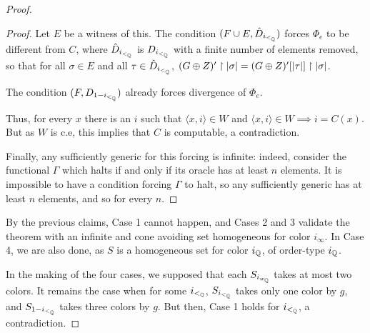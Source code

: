 \begin{proof}
\begin{proof}
     Let $E$ be a witness of
      this. The condition $(F\cup E, \hat D_{i_{<_{\mathbb{Q}}}})$ forces $\Phi_e$ to
      be different from $C$, where $\hat D_{i_{<_{\mathbb{Q}}}}$ is $D_{i_{<_{\mathbb{Q}}}}$ with a
      finite number of elements removed, so that for all $\sigma\in E$ and all $\tau\in \hat D_{i_{<_{\mathbb{Q}}}}$,
      $(G\oplus Z)'\upharpoonright|\sigma| = (G\oplus Z)'[|\tau|]\upharpoonright|\sigma|$.

     The condition $(F,D_{1-{i_{<_{\mathbb{Q}}}}})$ already forces divergence of $\Phi_e$.

     Thus, for every $x$ there is an $i$ such that $\langle x,i\rangle\in W$ and $\langle x,i\rangle\in W\implies i=C(x)$. But as $W$ is c.e, this implies that $C$ is computable, a contradiction.
    


	\medskip
      Finally, any sufficiently generic for this forcing is infinite: indeed, consider the functional $\Gamma$ which halts if and only if its oracle has at least $n$ elements. It is impossible to have a condition forcing $\Gamma$ to halt, so any sufficiently generic has at least $n$ elements, and so for every $n$. %
    \end{proof}
    By the previous claims, Case 1 cannot happen, and Cases 2 and 3 validate the theorem with an infinite and cone avoiding set homogeneous for color $i_\infty$. In Case 4, we are also done, as $S$ is a homogeneous set for color $i_{\mathbb{Q}}$, of order-type $i_{\mathbb{Q}}$.

    In the making of the four cases, we supposed that each $S_{i_{w_{\mathbb{Q}}}}$ takes at most two colors. It remains the case when for some ${i_{<_{\mathbb{Q}}}}$, $S_{i_{<_{\mathbb{Q}}}}$ takes only one color by $g$, and $S_{1-{i_{<_{\mathbb{Q}}}}}$ takes three colors by $g$. But then, Case 1 holds for ${i_{<_{\mathbb{Q}}}}$, a contradiction.
\end{proof}

